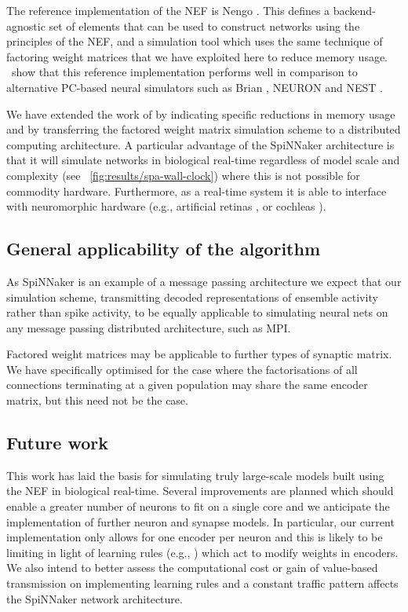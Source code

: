 \documentclass[conference]{IEEEtran}
\begin{document}
  The reference implementation of the NEF is Nengo \parencite{Bekolay2014}.
  This defines a backend-agnostic set of elements that can be used to construct networks using the principles of the NEF, and a simulation tool which uses the same technique of factoring weight matrices that we have exploited here to reduce memory usage.
  \textcite*{Bekolay2014}\ show that this reference implementation performs well in comparison to alternative PC-based neural simulators such as Brian \parencite{Goodman2009}, NEURON \parencite{carnevale2006neuron} and NEST \parencite{Gewaltig2007}.

  We have extended the work of \citeauthor*{Bekolay2014} by indicating specific reductions in memory usage and by transferring the factored weight matrix simulation scheme to a distributed computing architecture.
  A particular advantage of the SpiNNaker architecture is that it will simulate networks in biological real-time regardless of model scale and complexity (see \figurename~\ref{fig:results/spa-wall-clock}) where this is not possible for commodity hardware.
  Furthermore, as a real-time system it is able to interface with neuromorphic hardware (e.g., artificial retinas \parencite{}, or cochleas \parencite{}).

  \subsection{General applicability of the algorithm}

  As SpiNNaker is an example of a message passing architecture we expect that our simulation scheme, transmitting decoded representations of ensemble activity rather than spike activity, to be equally applicable to simulating neural nets on any message passing distributed architecture, such as MPI.

  Factored weight matrices may be applicable to further types of synaptic matrix.
  We have specifically optimised for the case where the factorisations of all connections terminating at a given population may share the same encoder matrix, but this need not be the case.

  \subsection{Future work}

  This work has laid the basis for simulating truly large-scale models built using the NEF in biological real-time.
  Several improvements are planned which should enable a greater number of neurons to fit on a single core and we anticipate the implementation of further neuron and synapse models.
  In particular, our current implementation only allows for one encoder per neuron and this is likely to be limiting in light of learning rules (e.g., \parencite{Voelker2014}) which act to modify weights in encoders.
  We also intend to better assess the computational cost or gain of value-based transmission on implementing learning rules and a constant traffic pattern affects the SpiNNaker network architecture.
\end{document}
